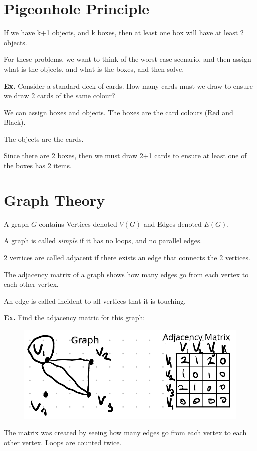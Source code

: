 \documentclass[12pt,letterpaper]{article} \usepackage{amsmath} \usepackage{graphicx}  \usepackage{longtable}  \usepackage{amssymb}
\begin{document}
    \section{Pigeonhole Principle}
    If we have k+1 objects, and k boxes, then at least one box will have at least 2 objects.

    For these problems, we want to think of the worst case scenario, and then assign what is the objects, and what is the boxes, and then solve. 

    \begin{mdframed}
        \textbf{Ex. } Consider a standard deck of cards. How many cards must we draw to ensure we draw 2 cards of the same colour?

        We can assign boxes and objects. The boxes are the card colours (Red and Black).

        The objects are the cards. 

        Since there are 2 boxes, then we must draw 2+1 cards to ensure at least one of the boxes has 2 items.
    \end{mdframed}

    \section{Graph Theory}
    A graph $G$ contains Vertices denoted $V(G)$ and Edges denoted $E(G)$.

    A graph is called \emph{simple} if it has no loops, and no parallel edges. 

    2 vertices are called adjacent if there exists an edge that connects the 2 vertices. 

    The adjacency matrix of a graph shows how many edges go from each vertex to each other vertex. 

    An edge is called incident to all vertices that it is touching.

    \begin{mdframed}
        \textbf{Ex. } Find the adjacency matric for this graph:
        \begin{figure}[H]
            \centering
            \includegraphics[width=0.5\linewidth]{Ex7.png}
        \end{figure}

        The matrix was created by seeing how many edges go from each vertex to each other vertex. Loops are counted twice.

    \end{mdframed}
\end{document}

